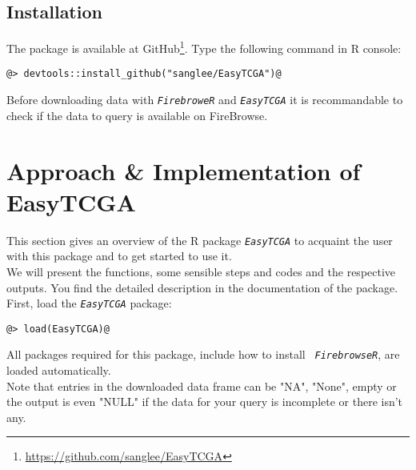 \documentclass{TechReport}
\begin{document}
\subsection{Installation}
The package is available at
GitHub\footnote{\url{https://github.com/sanglee/EasyTCGA}}. Type the following
command in R console:
\begin{lstlisting}[style=base]
@> devtools::install_github("sanglee/EasyTCGA")@
\end{lstlisting}
Before downloading data with \texttt{\em FirebroweR} and \texttt{\em EasyTCGA} it is
recommandable to check if the data to query is available 
on FireBrowse\footnotemark[4].\\

\section{Approach \& Implementation of EasyTCGA}
This section gives an overview of the R package \texttt{\em EasyTCGA} to acquaint
the user with this package and to get started to use it.\\
We will present the functions, some sensible steps and codes and the respective
outputs. You find the detailed description in the
documentation of the package.\\
First, load the \texttt{\em EasyTCGA} package:
\begin{lstlisting}[style=base]
@> load(EasyTCGA)@
\end{lstlisting}
All packages required for this package, include how to install \texttt{\em
FirebrowseR}, are loaded automatically.\\
Note that entries in the downloaded data frame can be "NA", "None", empty or the output is even
"NULL" if the data for your query is incomplete or there isn't any.\\
\end{document}
